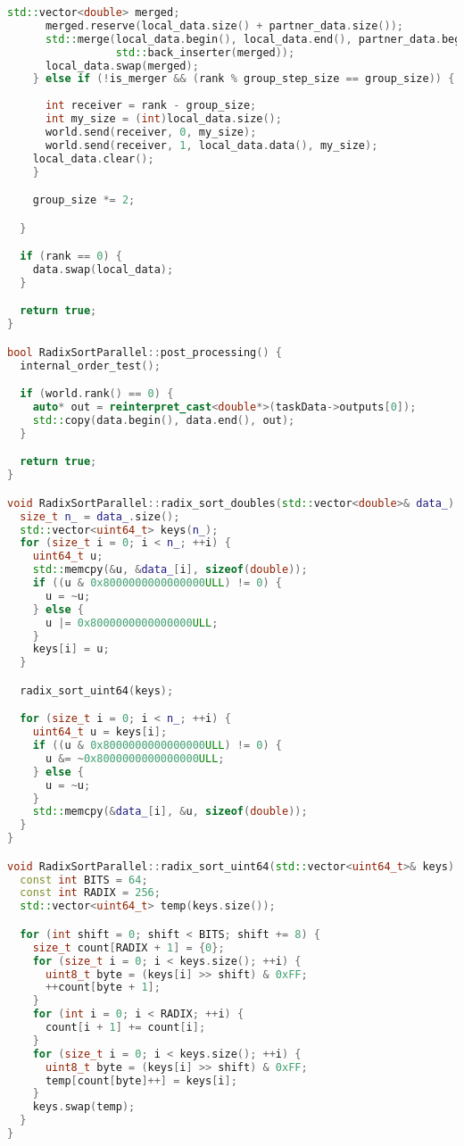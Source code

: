 \documentclass[a4paper,12pt]{article}
\begin{document}
\begin{lstlisting}[language=C++, caption={Реализация}]
      std::vector<double> merged;
      merged.reserve(local_data.size() + partner_data.size());
      std::merge(local_data.begin(), local_data.end(), partner_data.begin(), partner_data.end(),
                 std::back_inserter(merged));
      local_data.swap(merged);
    } else if (!is_merger && (rank % group_step_size == group_size)) {
     
      int receiver = rank - group_size;
      int my_size = (int)local_data.size();
      world.send(receiver, 0, my_size);
      world.send(receiver, 1, local_data.data(), my_size);
    local_data.clear();
    }

    group_size *= 2;

  }

  if (rank == 0) {
    data.swap(local_data);
  }

  return true;
}

bool RadixSortParallel::post_processing() {
  internal_order_test();

  if (world.rank() == 0) {
    auto* out = reinterpret_cast<double*>(taskData->outputs[0]);
    std::copy(data.begin(), data.end(), out);
  }

  return true;
}

void RadixSortParallel::radix_sort_doubles(std::vector<double>& data_) {
  size_t n_ = data_.size();
  std::vector<uint64_t> keys(n_);
  for (size_t i = 0; i < n_; ++i) {
    uint64_t u;
    std::memcpy(&u, &data_[i], sizeof(double));
    if ((u & 0x8000000000000000ULL) != 0) {
      u = ~u;
    } else {
      u |= 0x8000000000000000ULL;
    }
    keys[i] = u;
  }

  radix_sort_uint64(keys);

  for (size_t i = 0; i < n_; ++i) {
    uint64_t u = keys[i];
    if ((u & 0x8000000000000000ULL) != 0) {
      u &= ~0x8000000000000000ULL;
    } else {
      u = ~u;
    }
    std::memcpy(&data_[i], &u, sizeof(double));
  }
}

void RadixSortParallel::radix_sort_uint64(std::vector<uint64_t>& keys) {
  const int BITS = 64;
  const int RADIX = 256;
  std::vector<uint64_t> temp(keys.size());

  for (int shift = 0; shift < BITS; shift += 8) {
    size_t count[RADIX + 1] = {0};
    for (size_t i = 0; i < keys.size(); ++i) {
      uint8_t byte = (keys[i] >> shift) & 0xFF;
      ++count[byte + 1];
    }
    for (int i = 0; i < RADIX; ++i) {
      count[i + 1] += count[i];
    }
    for (size_t i = 0; i < keys.size(); ++i) {
      uint8_t byte = (keys[i] >> shift) & 0xFF;
      temp[count[byte]++] = keys[i];
    }
    keys.swap(temp);
  }
}
\end{lstlisting}
\end{document}
